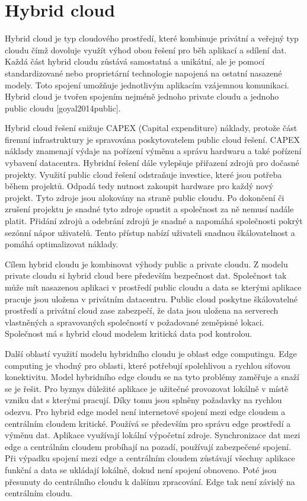 \chapter{Hybrid cloud}
Hybrid cloud je typ cloudového prostředí, které kombinuje privátní a veřejný typ cloudu čímž dovoluje využít výhod obou řešení pro běh aplikací a sdílení dat. Každá část hybrid cloudu zůstává samostatná a unikátní, ale je pomocí standardizované nebo proprietární technologie napojená na ostatní nasazené modely. Toto spojení umožňuje jednotlivým aplikacím vzájemnou komunikaci. Hybrid cloud je tvořen spojením nejméně jednoho private cloudu a jednoho public cloudu [goyal2014public]. \par
    Hybrid cloud řešení snižuje CAPEX (Capital expenditure) náklady, protože část firemní infrastruktury je spravována poskytovatelem public cloud řešení. CAPEX náklady znamenají výdaje na pořízení výměnu a správu hardwaru a také pořízení vybavení datacentra. Hybridní řešení dále vylepšuje přiřazení zdrojů pro dočasné projekty. Využití public cloud řešení odstraňuje investice, které jsou potřeba během projektů. Odpadá tedy nutnost zakoupit hardware pro každý nový projekt. Tyto zdroje jsou alokovány na straně public cloudu. Po dokončení či zrušení projektu je snadné tyto zdroje opustit a společnost za ně nemusí nadále platit. Přidání zdrojů a odebrání zdrojů je snadné a napomáhá společnosti pokrýt sezónní nápor uživatelů. Tento přístup nabízí uživateli snadnou škálovatelnost a pomáhá optimalizovat náklady. \par
        Cílem hybrid cloudu je kombinovat výhody public a private cloudu. Z modelu private cloudu si hybrid cloud bere především bezpečnost dat. Společnost tak může mít nasazenou aplikaci v prostředí public cloudu a data se kterými aplikace pracuje jsou uložena v privátním datacentru. Public cloud poskytne škálovatelné prostředí a privátní cloud zase zabezpečí, že data jsou uložena na serverech vlastněných a spravovaných společností v požadované zeměpisné lokaci. Společnost má s hybrid cloud modelem kritická data pod kontrolou. \par
	Další oblastí využití modelu hybridního cloudu je oblast edge computingu. Edge computing je vhodný pro oblasti, které potřebují spolehlivou a rychlou síťovou konektivitu. Model hybridního edge cloudu se na tyto problémy zaměřuje a snaží se je řešit. Pro byznys důležité aplikace je užitečné provozovat lokálně v místě vzniku dat s kterými pracují. Díky tomu jsou splněny požadavky na rychlou odezvu. Pro hybrid edge model není internetové spojení mezi edge cloudem a centrálním cloudem kritické. Používá se především pro správu edge prostředí a výměnu dat. Aplikace využívají lokální výpočetní zdroje. Synchronizace dat mezi edge a centrálním cloudem probíhají na pozadí, používají zabezpečené spojení. Při výpadku spojení mezi edge a centrálním cloudem zůstávají všechny aplikace funkční a data se ukládají lokálně, dokud není spojení obnoveno. Poté jsou přesunuty do centrálního cloudu k dalšímu zpracování. Edge tak není závislý na centrálním cloudu.\par
